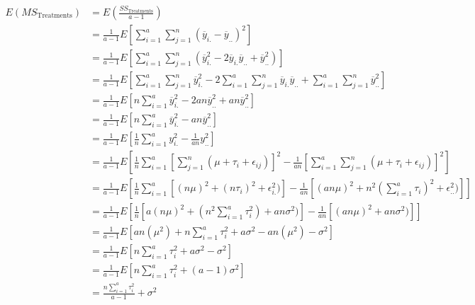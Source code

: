 \documentclass{article}
\begin{document}
\begin{equation}
    \begin{split}
        E(MS_{\text{Treatments}}) & = E (\frac{SS_{\text{Treatments}}}{a - 1}) \\ 
        & = \frac{1}{a - 1}E\left[\sum_{i=1}^{a}\sum_{j=1}^{n}(\overline{y}_{i.} - \overline{y}_{..})^2\right] \\
        & = \frac{1}{a - 1}E\left[\sum_{i=1}^{a}\sum_{j=1}^{n} (\overline{y}_{i.}^2 - 2\overline{y}_{i.}\overline{y}_{..} + \overline{y}_{..}^{2})\right]\\
        & = \frac{1}{a - 1}E\left[\sum_{i=1}^{a}\sum_{j=1}^{n}\overline{y}_{i.}^2 - 2\sum_{i=1}^{a}\sum_{j=1}^{n}\overline{y}_{i.}\overline{y}_{..} + \sum_{i=1}^{a}\sum_{j=1}^{n}\overline{y}_{..}^{2}\right] \\
        & = \frac{1}{a - 1}E\left[n\sum_{i=1}^{a}\overline{y}_{i.}^2 - 2an\overline{y}_{..}^2 + an\overline{y}_{..}^{2}\right] \\
        & = \frac{1}{a - 1}E\left[n\sum_{i=1}^{a}\overline{y}_{i.}^2 - an\overline{y}_{..}^{2}\right] \\
        & = \frac{1}{a - 1}E\left[\frac{1}{n}\sum_{i=1}^{a}y_{i.}^2 - \frac{1}{an}y_{..}^{2}\right] \\
        & = \frac{1}{a - 1}E\left[\frac{1}{n}\sum_{i=1}^{a}\left[\sum_{j=1}^{n}(\mu + \tau_{i} + \epsilon_{ij})\right]^2 - \frac{1}{an}\left[ \sum_{i=1}^{a}\sum_{j=1}^{n}(\mu + \tau_i + \epsilon_{ij})\right]^2\right] \\
        & = \frac{1}{a - 1}E\left[\frac{1}{n}\sum_{i=1}^{a}\left[(n\mu)^2 + (n\tau_{i})^2 + \epsilon_{i.}^2)\right] - \frac{1}{an}\left[ (an\mu)^2 + n^2(\sum_{i=1}^{a}\tau_i)^2 + \epsilon_{..}^2)\right]\right] \\
        & = \frac{1}{a - 1}E\left[\frac{1}{n}\left[a(n\mu)^2 + (n^2\sum_{i=1}^{a}\tau_{i}^2) + an\sigma^2)\right] - \frac{1}{an}\left[ (an\mu)^2 + an\sigma^2)\right]\right] \\
        & = \frac{1}{a - 1}E\left[an(\mu^2) + n\sum_{i=1}^{a}\tau_{i}^2 + a\sigma^2 - an(\mu^2) - \sigma^2\right] \\
        & = \frac{1}{a - 1}E\left[ n\sum_{i=1}^{a}\tau_{i}^2 + a\sigma^2 - \sigma^2\right] \\
        & = \frac{1}{a - 1}E\left[ n\sum_{i=1}^{a}\tau_{i}^2 + (a - 1)\sigma^2\right] \\
         & = \frac{n\sum_{i=1}^{a}\tau_{i}^2}{a - 1} + \sigma^2 \\
    \end{split}
\end{equation}
\end{document}
